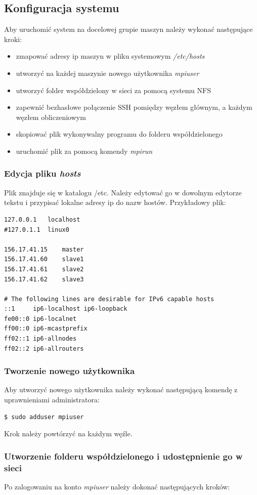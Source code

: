 \documentclass{article}
\begin{document}
\subsection{Konfiguracja systemu}
Aby uruchomić system na docelowej grupie maszyn należy wykonać następujące kroki:
\begin{itemize}
\item zmapować adresy ip maszyn w pliku systemowym \textit{/etc/hosts}
\item utworzyć na każdej maszynie nowego użytkownika \textit{mpiuser}
\item utworzyć folder współdzielony w sieci za pomocą systemu NFS
\item zapewnić bezhasłowe połączenie SSH pomiędzy węzłem głównym, a każdym węzłem obliczeniowym
\item skopiować plik wykonywalny programu do folderu współdzielonego
\item uruchomić plik za pomocą komendy \textit{mpirun}
\end{itemize}
\newpage
\subsubsection{Edycja pliku \textit{hosts}}

Plik znajduje się w katalogu /etc. Należy edytować go w dowolnym edytorze tekstu i przypisać lokalne adresy ip do nazw hostów. Przykładowy plik:
\begin{lstlisting}
127.0.0.1	localhost
#127.0.1.1	linux0

156.17.41.15	master
156.17.41.60	slave1
156.17.41.61	slave2
156.17.41.62	slave3

# The following lines are desirable for IPv6 capable hosts
::1     ip6-localhost ip6-loopback
fe00::0 ip6-localnet
ff00::0 ip6-mcastprefix
ff02::1 ip6-allnodes
ff02::2 ip6-allrouters
\end{lstlisting}

\subsubsection{Tworzenie nowego użytkownika}

Aby utworzyć nowego użytkownika należy wykonać następującą komendę z uprawnieniami administratora:
\begin{lstlisting}
$ sudo adduser mpiuser
\end{lstlisting}

Krok należy powtórzyć na każdym węźle.

\subsubsection{Utworzenie folderu współdzielonego i udostępnienie go w sieci}
Po zalogowaniu na konto \textit{mpiuser} należy dokonać następujących kroków:
\end{document}
